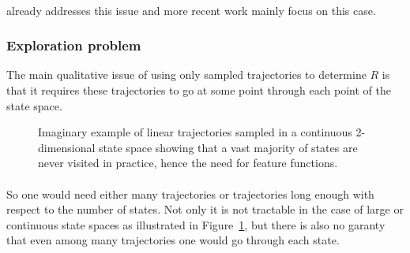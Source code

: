 \documentclass{article}
\begin{document}
\paragraph{}
\cite{Ng00} already addresses this issue and more recent work mainly focus on this case.

\subsubsection{Exploration problem}
The main qualitative issue of using only sampled trajectories to determine $R$ is that it requires these trajectories to go at some point through each point of the state space.

\begin{figure}
\begin{center}
\end{center}
\caption{Imaginary example of linear trajectories sampled in a continuous 2-dimensional state space showing that a vast majority of states are never visited in practice, hence the need for feature functions. \label{fig:continuous-grid}}
\end{figure}


\paragraph{}
So one would need either many trajectories or trajectories long enough with respect to the number of states. Not only it is not tractable in the case of large or continuous state spaces as illustrated in Figure~\ref{fig:continuous-grid}, but there is also no garanty that even among many trajectories one would go through each state.
\end{document}
